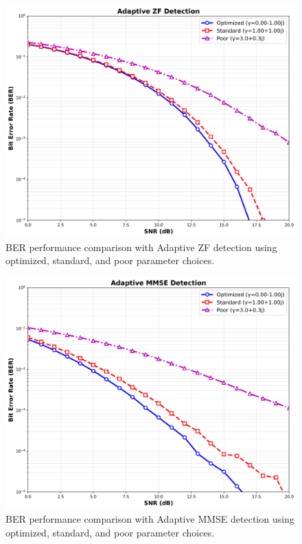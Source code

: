 \begin{figure}[!t]
\centering
\includegraphics[width=0.9\columnwidth]{figures/adaptive_zf_detection.png}
\caption{BER performance comparison with Adaptive ZF detection using optimized, standard, and poor parameter choices.}
\label{fig:adaptive_zf_plot}
\end{figure}

\begin{figure}[!t]
\centering
\includegraphics[width=0.9\columnwidth]{figures/adaptive_mmse_detection.png}
\caption{BER performance comparison with Adaptive MMSE detection using optimized, standard, and poor parameter choices.}
\label{fig:adaptive_mmse_plot}
\end{figure}

